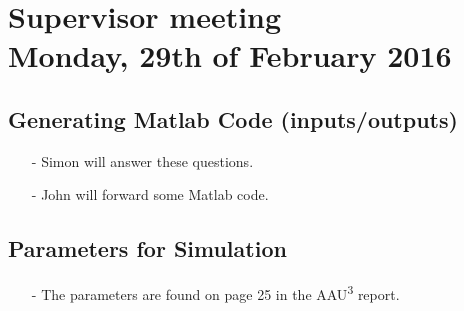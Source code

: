 

\renewcommand\chaptername{KAPITEL}
\renewcommand\contentsname{Indhold}
\renewcommand\figurename{Figur}
\renewcommand\tablename{Tabel}

\section*{Supervisor meeting\\ \small Monday, 29th of February 2016}

\subsection{Generating Matlab Code (inputs/outputs)}
\begin{itemize}
  \item[-] Simon will answer these questions.
  \item[-] John will forward some Matlab code.
\end{itemize}

\subsection{Parameters for Simulation}
\begin{itemize}
  \item[-] The parameters are found on page 25 in the \si{AAU^3} report.
\end{itemize}

